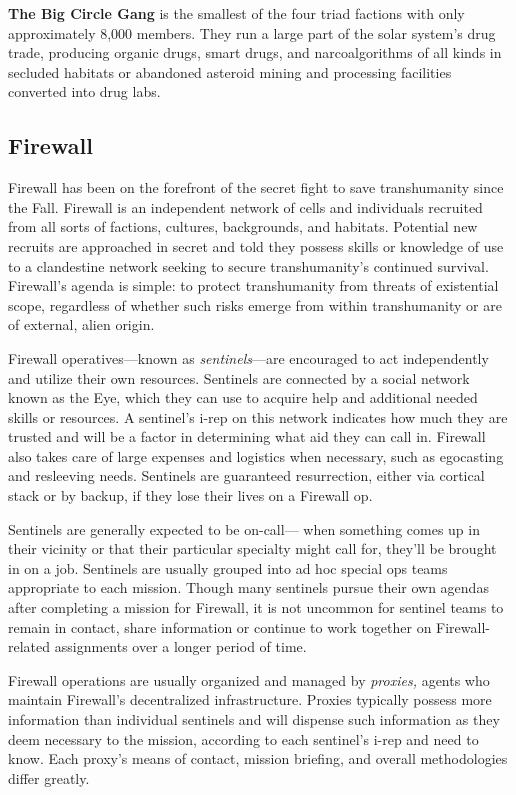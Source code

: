\textbf{The Big Circle Gang} is the smallest of the four triad 
factions with only approximately 8,000 members. 
They run a large part of the solar system's drug trade, 
producing organic drugs, smart drugs, and narcoalgorithms of all kinds in secluded habitats or abandoned 
asteroid mining and processing facilities converted 
into drug labs.

\subsection{Firewall}

Firewall has been on the forefront of the secret fight 
to save transhumanity since the Fall. Firewall is an independent network of cells and individuals recruited 
from all sorts of factions, cultures, backgrounds, 
and habitats. Potential new recruits are approached 
in secret and told they possess skills or knowledge 
of use to a clandestine network seeking to secure 
transhumanity's continued survival. Firewall's agenda 
is simple: to protect transhumanity from threats of 
existential scope, regardless of whether such risks 
emerge from within transhumanity or are of external, 
alien origin.

Firewall operatives—known as \textit{sentinels}—are encouraged to act independently and utilize their own 
resources. Sentinels are connected by a social network 
known as the Eye, which they can use to acquire help 
and additional needed skills or resources. A sentinel's 
i-rep on this network indicates how much they are 
trusted and will be a factor in determining what 
aid they can call in. Firewall also takes care of large 
expenses and logistics when necessary, such as egocasting and resleeving needs. Sentinels are guaranteed 
resurrection, either via cortical stack or by backup, if 
they lose their lives on a Firewall op.

Sentinels are generally expected to be on-call—
when something comes up in their vicinity or that 
their particular specialty might call for, they'll be 
brought in on a job. Sentinels are usually grouped into 
ad hoc special ops teams appropriate to each mission. 
Though many sentinels pursue their own agendas 
after completing a mission for Firewall, it is not uncommon for sentinel teams to remain in contact, share 
information or continue to work together on Firewall-related assignments over a longer period of time.

Firewall operations are usually organized and 
managed by \textit{proxies,} agents who maintain Firewall's 
decentralized infrastructure. Proxies typically possess 
more information than individual sentinels and will 
dispense such information as they deem necessary 
to the mission, according to each sentinel's i-rep and 
need to know. Each proxy's means of contact, mission 
briefing, and overall methodologies differ greatly.

